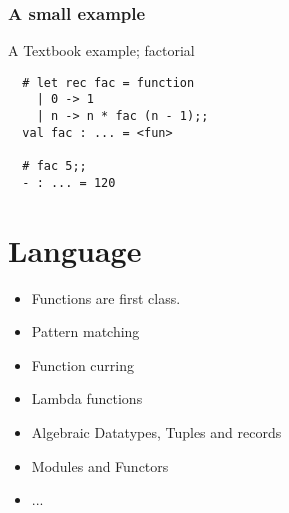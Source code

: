 \documentclass[mathserif,xcolor=svgnames]{beamer}
\renewcommand{\_}{\mathunderscore}
\begin{document}



\begin{frame}[fragile]
  \frametitle{A small example}
  A Textbook example; factorial
  \begin{lstlisting}
  # let rec fac = function
    | 0 -> 1
    | n -> n * fac (n - 1);;
  val fac : ... = <fun>

  # fac 5;;
  - : ... = 120

  \end{lstlisting}
\end{frame}

\section{Language}
\begin{frame}
  \begin{itemize}
  \item Functions are first class.
  \item Pattern matching
  \item Function curring
  \item Lambda functions
  \item Algebraic Datatypes, Tuples and records
  \item Modules and Functors
  \item ...
  \end{itemize}
\end{frame}


\end{document}
